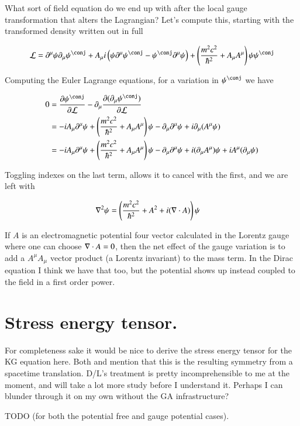 \documentclass{article}
\begin{document}
What sort of field equation do we end up with after the local gauge transformation that alters the Lagrangian?  Let's compute this, starting with the transformed density written out in full

\begin{align*}
\LL
&=
\partial^\mu \psi \partial_\mu \psi^\conj
+ A_\mu %
i \left(
\psi \partial^\mu \psi^\conj
-\psi^\conj \partial^\mu \psi
\right) 
+ \left( \frac{m^2 c^2}{\hbar^2} + A_\mu A^\mu \right) \psi {\psi}^\conj \\
\end{align*}

Computing the Euler Lagrange equations, for a variation in $\psi^\conj$ we have

\begin{align*}
0 &= 
\PD{\psi^\conj}{\LL}
- \partial_\mu \PD{(\partial_\mu \psi^\conj)}{\LL} \\
&= -i A_\mu \partial^\mu \psi
+ \left( \frac{m^2 c^2}{\hbar^2} + A_\mu A^\mu \right) \psi 
-\partial_\mu \partial^\mu \psi  + i \partial_\mu (A^\mu \psi) \\
&= -i A_\mu \partial^\mu \psi
+ \left( \frac{m^2 c^2}{\hbar^2} + A_\mu A^\mu \right) \psi 
-\partial_\mu \partial^\mu \psi  
+ i (\partial_\mu A^\mu) \psi 
+ i A^\mu (\partial_\mu \psi) \\
\end{align*}

Toggling indexes on the last term, allows it to cancel with the first, and we are left with

\begin{align*}
\nabla^2 \psi
&= \left( \frac{m^2 c^2}{\hbar^2} + A^2 + i (\nabla \cdot A) \right) \psi 
\end{align*}

If $A$ is an electromagnetic potential four vector calculated in the Lorentz gauge where one can choose $\nabla \cdot A = 0$, 
then the net effect of the gauge variation is to add a $A^\mu A_\mu$ vector product (a Lorentz invariant) to the mass term.  In the Dirac equation I think we have that too, but the potential shows up instead coupled to the field in a first
order power.

\section{ Stress energy tensor. }

For completeness sake it would be nice to derive the stress energy tensor
for the KG equation here.  Both \cite{srednicki2007qft} and \cite{doran2003gap} mention that this is the resulting symmetry from
a spacetime translation.  D/L's treatment is pretty incomprehensible to me
at the moment, and will take a lot more study before I understand
it.  Perhaps I can blunder through it on my own without the GA infrastructure?

TODO (for both the potential free and gauge potential cases).



\end{document}

